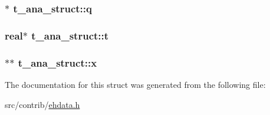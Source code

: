 \hypertarget{structt__ana__struct_a6d40108281c79df2c677aecb7f4a4e3a}{
\subsubsection[{q}]{$\ast$ {\bf t\-\_\-ana\-\_\-struct\-::q}}}\label{structt__ana__struct_a6d40108281c79df2c677aecb7f4a4e3a}
\hypertarget{structt__ana__struct_ad70531ddfbb91a6479c1592ec7bec208}{
\subsubsection[{t}]{\setlength{\rightskip}{0pt plus 5cm}real$\ast$ {\bf t\-\_\-ana\-\_\-struct\-::t}}}\label{structt__ana__struct_ad70531ddfbb91a6479c1592ec7bec208}
\hypertarget{structt__ana__struct_a23753615763ed9f03a778b689282e1d8}{
\subsubsection[{x}]{$\ast$$\ast$ {\bf t\-\_\-ana\-\_\-struct\-::x}}}\label{structt__ana__struct_a23753615763ed9f03a778b689282e1d8}


\-The documentation for this struct was generated from the following file\-:\begin{DoxyCompactItemize}
\item 
src/contrib/\hyperlink{ehdata_8h}{ehdata.\-h}\end{DoxyCompactItemize}
